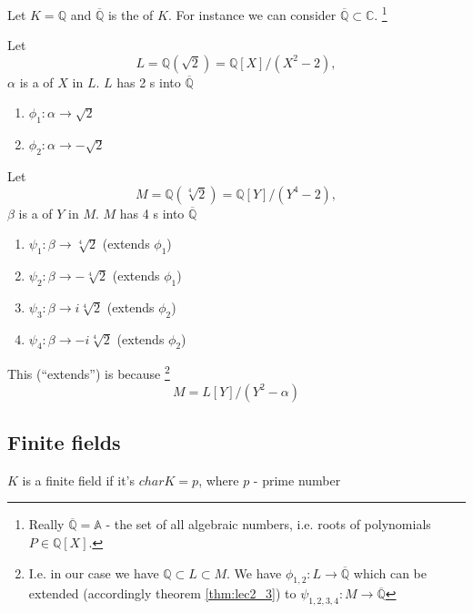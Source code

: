 \begin{example}
  Let $K = \mathbb{Q}$ and $\overline{\mathbb{Q}}$ is the
   of $K$. For instance we can consider
  $\overline{\mathbb{Q}} \subset \mathbb{C}$.
  \footnote{
    Really $\overline{\mathbb{Q}} = \mathbb{A}$ - the set of all algebraic
    numbers, i.e. roots of polynomials $P \in
    \mathbb{Q}\left[X\right]$.
  }

  Let
  \[
  L = \mathbb{Q}\left(\sqrt{2}\right) =
  \mathbb{Q}\left[X\right]/\left(X^2 - 2\right),
  \]
  $\alpha$ is a  of $X$ in $L$. $L$ has 2
  s into 
  $\overline{\mathbb{Q}}$
  \begin{enumerate}
  \item $\phi_1: \alpha \to \sqrt{2}$
  \item $\phi_2: \alpha \to -\sqrt{2}$
  \end{enumerate}

  Let
  \[
  M = \mathbb{Q}\left(\sqrt[4]{2}\right) =
  \mathbb{Q}\left[Y\right]/\left(Y^4 - 2\right),
  \]
  $\beta$ is a  of $Y$ in $M$. $M$ has 4
  s into 
  $\overline{\mathbb{Q}}$
  \begin{enumerate}
  \item $\psi_1: \beta \to \sqrt[4]{2}$ (extends $\phi_1$)
  \item $\psi_2: \beta \to -\sqrt[4]{2}$ (extends $\phi_1$)
  \item $\psi_3: \beta \to i\sqrt[4]{2}$ (extends $\phi_2$)
  \item $\psi_4: \beta \to -i\sqrt[4]{2}$ (extends $\phi_2$)
  \end{enumerate}
  This (``extends'') is because
  \footnote{
    I.e. in our case we have $\mathbb{Q} \subset L \subset M$. We have
    $\phi_{1,2} : L \to \overline{\mathbb{Q}}$ which can be extended
    (accordingly theorem \ref{thm:lec2_3}) to
    $\psi_{1,2,3,4} : M \to \overline{\mathbb{Q}}$
  }
  \[
  M = L\left[Y\right]/\left(Y^2 - \alpha\right) 
  \]
  \label{ex:homomorphismext}
\end{example}

\subsection{Finite fields}

\begin{definition}
  $K$ is a finite field if it's 
  $char K = p$, where $p$  
  - prime number 
  \label{def:finitefield}
\end{definition}

